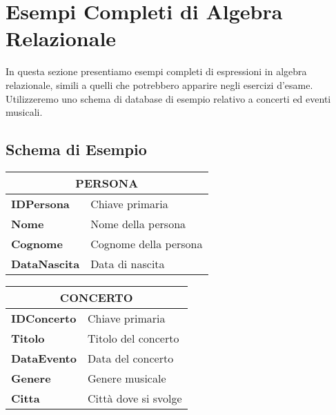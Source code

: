 	\section{Esempi Completi di Algebra Relazionale}
	
	In questa sezione presentiamo esempi completi di espressioni in algebra relazionale, simili a quelli che potrebbero apparire negli esercizi d'esame. Utilizzeremo uno schema di database di esempio relativo a concerti ed eventi musicali.
	
	\subsection{Schema di Esempio}
	
	\begin{table}[htbp]
		\centering
		\begin{tabular}{|l|l|}
			\hline
			\multicolumn{2}{|c|}{\textbf{PERSONA}} \\
			\hline
			\textbf{IDPersona} & Chiave primaria \\
			\textbf{Nome} & Nome della persona \\
			\textbf{Cognome} & Cognome della persona \\
			\textbf{DataNascita} & Data di nascita \\
			\hline
		\end{tabular}
		\hspace{1cm}
		\begin{tabular}{|l|l|}
			\hline
			\multicolumn{2}{|c|}{\textbf{CONCERTO}} \\
			\hline
			\textbf{IDConcerto} & Chiave primaria \\
			\textbf{Titolo} & Titolo del concerto \\
			\textbf{DataEvento} & Data del concerto \\
			\textbf{Genere} & Genere musicale \\
			\textbf{Citta} & Città dove si svolge \\
			\hline
		\end{tabular}
		
		\vspace{0.5cm}
		

\end{table}
